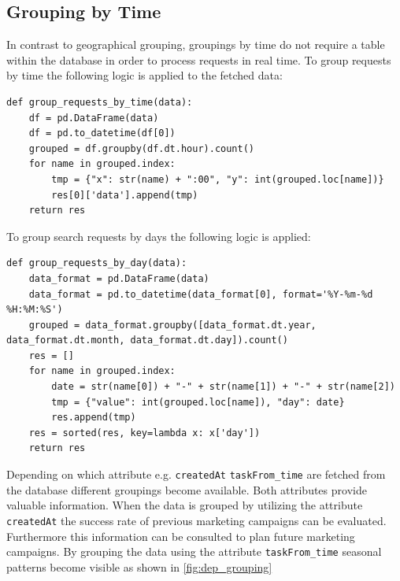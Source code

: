 \subsection{Grouping by Time}
In contrast to geographical grouping, groupings by time do not require a table within the database in order to process requests in real time. To group requests by time the following logic is applied to the fetched data: 
\begin{lstlisting}
def group_requests_by_time(data):
    df = pd.DataFrame(data)
    df = pd.to_datetime(df[0])
    grouped = df.groupby(df.dt.hour).count()
    for name in grouped.index:
        tmp = {"x": str(name) + ":00", "y": int(grouped.loc[name])}
        res[0]['data'].append(tmp)
    return res
\end{lstlisting}
To group search requests by days the following logic is applied: 
\begin{lstlisting}
def group_requests_by_day(data):
    data_format = pd.DataFrame(data)
    data_format = pd.to_datetime(data_format[0], format='%Y-%m-%d %H:%M:%S')
    grouped = data_format.groupby([data_format.dt.year, data_format.dt.month, data_format.dt.day]).count()
    res = []
    for name in grouped.index:
        date = str(name[0]) + "-" + str(name[1]) + "-" + str(name[2])
        tmp = {"value": int(grouped.loc[name]), "day": date}
        res.append(tmp)
    res = sorted(res, key=lambda x: x['day'])
    return res
\end{lstlisting}
Depending on which attribute e.g. \verb|createdAt| \verb|taskFrom_time| are fetched from the database different groupings become available. Both attributes provide valuable information. When the data is grouped by utilizing the attribute \verb|createdAt| the success rate of previous marketing campaigns can be evaluated. Furthermore this information can be consulted to plan future marketing campaigns. By grouping the data using the attribute \verb|taskFrom_time| seasonal patterns become visible as shown in \ref{fig:dep_grouping}
